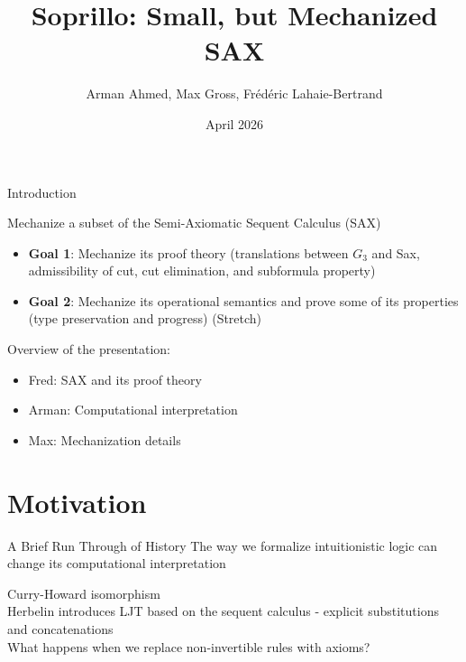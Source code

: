 \documentclass[9ps]{beamer}
\title{Soprillo: Small, but Mechanized SAX}
\author{Arman Ahmed, Max Gross, Fr\'{e}d\'{e}ric Lahaie-Bertrand}
\date{April 2026}
\begin{document}
\maketitle


\begin{frame}{Introduction}
\small
  
Mechanize a subset of the Semi-Axiomatic Sequent Calculus (SAX) 
\begin{itemize}
  \item \textbf{Goal 1}: Mechanize its proof theory (translations between $G_3$
    and Sax, admissibility of cut, cut elimination, and subformula property)
  \item \textbf{Goal 2}: Mechanize its operational semantics and prove some of
    its properties (type preservation and progress) (Stretch)
\end{itemize}

\medskip
Overview of the presentation:
\begin{itemize}
  \item Fred: SAX and its proof theory
  \item Arman: Computational interpretation 
  \item Max: Mechanization details
\end{itemize}  
\end{frame}


\section{Motivation}
\begin{frame} {A Brief Run Through of History}
  The way we formalize intuitionistic logic can change its computational interpretation 
  \medskip{}

  \qquad Curry-Howard isomorphism \\
  \qquad Herbelin introduces LJT based on the sequent calculus - explicit substitutions and concatenations \\
  \qquad What happens when we replace non-invertible rules with axioms?



\end{frame}
\end{document}
